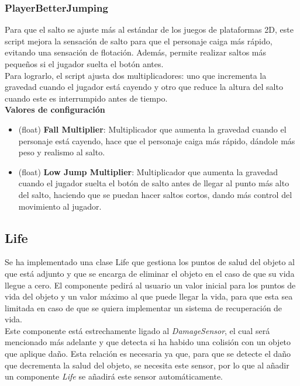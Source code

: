 \subsubsection{PlayerBetterJumping}

Para que el salto se ajuste más al estándar de los juegos de plataformas 2D, este script mejora la sensación de salto para que el personaje caiga más rápido, evitando una sensación de flotación. Además, permite realizar saltos más pequeños si el jugador suelta el botón antes.\\

Para lograrlo, el script ajusta dos multiplicadores: uno que incrementa la gravedad cuando el jugador está cayendo y otro que reduce la altura del salto cuando este es interrumpido antes de tiempo.\\

\textbf{Valores de configuración}
\begin{itemize}
	\item (float) \textbf{Fall Multiplier}: Multiplicador que aumenta la gravedad cuando el personaje está cayendo, hace que el personaje caiga más rápido, dándole más peso y realismo al salto.
	\item (float) \textbf{Low Jump Multiplier}: Multiplicador que aumenta la gravedad cuando el jugador suelta el botón de salto antes de llegar al punto más alto del salto, haciendo que se puedan hacer saltos cortos, dando más control del movimiento al jugador.
\end{itemize}

\subsection{Life}

Se ha implementado una clase Life que gestiona los puntos de salud del objeto al que está adjunto y que se encarga de eliminar el objeto en el caso de que su vida llegue a cero. El componente pedirá al usuario un valor inicial para los puntos de vida del objeto y un valor máximo al que puede llegar la vida, para que esta sea limitada en caso de que se quiera implementar un sistema de recuperación de vida.\\

Este componente está estrechamente ligado al \textit{DamageSensor}, el cual será mencionado más adelante y que detecta si ha habido una colisión con un objeto que aplique daño. Esta relación es necesaria ya que, para que se detecte el daño que decrementa la salud del objeto, se necesita este sensor, por lo que al añadir un componente \textit{Life} se añadirá este sensor automáticamente.\\

